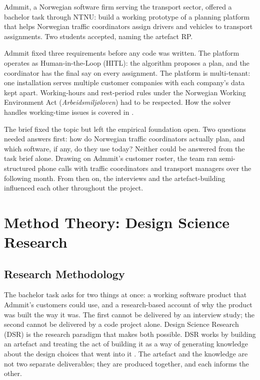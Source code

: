 Admmit, a Norwegian software firm serving the transport sector, offered a bachelor task through NTNU: build a working prototype of a planning platform that helps Norwegian traffic coordinators assign drivers and vehicles to transport assignments. Two students accepted, naming the artefact RP.

Admmit fixed three requirements before any code was written. The platform operates as Human-in-the-Loop (HITL): the algorithm proposes a plan, and the coordinator has the final say on every assignment. The platform is multi-tenant: one installation serves multiple customer companies with each company's data kept apart. Working-hours and rest-period rules under the Norwegian Working Environment Act (\textit{Arbeidsmiljøloven}) had to be respected. How the solver handles working-time issues is covered in .

The brief fixed the topic but left the empirical foundation open. Two questions needed answers first: how do Norwegian traffic coordinators actually plan, and which software, if any, do they use today? Neither could be answered from the task brief alone. Drawing on Admmit's customer roster, the team ran semi-structured phone calls with traffic coordinators and transport managers over the following month. From then on, the interviews and the artefact-building influenced each other throughout the project.

\section{Method Theory: Design Science Research}
\label{sec:dsr-dsrm}

\subsection{Research Methodology}
\label{sec:research-methodology}

The bachelor task asks for two things at once: a working software product that Admmit's customers could use, and a research-based account of why the product was built the way it was. The first cannot be delivered by an interview study; the second cannot be delivered by a code project alone. Design Science Research (DSR) is the research paradigm that makes both possible. DSR works by building an artefact and treating the act of building it as a way of generating knowledge about the design choices that went into it \parencite{hevner2007threecycle}. The artefact and the knowledge are not two separate deliverables; they are produced together, and each informs the other.

